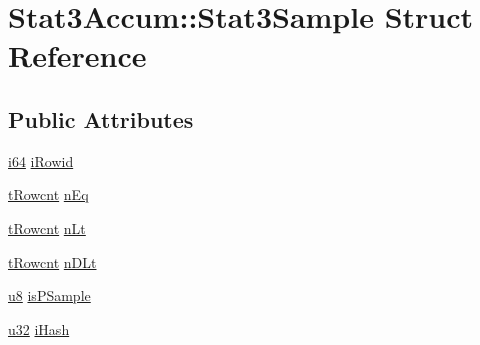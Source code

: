 \hypertarget{struct_stat3_accum_1_1_stat3_sample}{\section{Stat3\-Accum\-:\-:Stat3\-Sample Struct Reference}
\label{struct_stat3_accum_1_1_stat3_sample}
}
\subsection*{Public Attributes}
\begin{DoxyCompactItemize}
\item 
\hyperlink{sqlite3_8c_a2a0f0f4ae7001eb54351f77ea1cdbcfd}{i64} \hyperlink{struct_stat3_accum_1_1_stat3_sample_a5815d8421fb58c864b3d5e42df902e88}{i\-Rowid}
\item 
\hyperlink{sqlite3_8c_a6de101211e945e499510b624a65c28a4}{t\-Rowcnt} \hyperlink{struct_stat3_accum_1_1_stat3_sample_a91c387125f80023df372d3c4c19616b3}{n\-Eq}
\item 
\hyperlink{sqlite3_8c_a6de101211e945e499510b624a65c28a4}{t\-Rowcnt} \hyperlink{struct_stat3_accum_1_1_stat3_sample_aff2cb8657111e4084eea1e10e65938cc}{n\-Lt}
\item 
\hyperlink{sqlite3_8c_a6de101211e945e499510b624a65c28a4}{t\-Rowcnt} \hyperlink{struct_stat3_accum_1_1_stat3_sample_abc3c2023b9794646be59f695c9b85db2}{n\-D\-Lt}
\item 
\hyperlink{sqlite3_8c_a74a0f6424ae628af25f23f0a35f6ead3}{u8} \hyperlink{struct_stat3_accum_1_1_stat3_sample_a48bf958cce34aca54f30b69680558262}{is\-P\-Sample}
\item 
\hyperlink{sqlite3_8c_a03ad5adfaeb9b7640dde78a0cc390319}{u32} \hyperlink{struct_stat3_accum_1_1_stat3_sample_a3f1a7033f005705c0df65db3db626ffb}{i\-Hash}
\end{DoxyCompactItemize}


